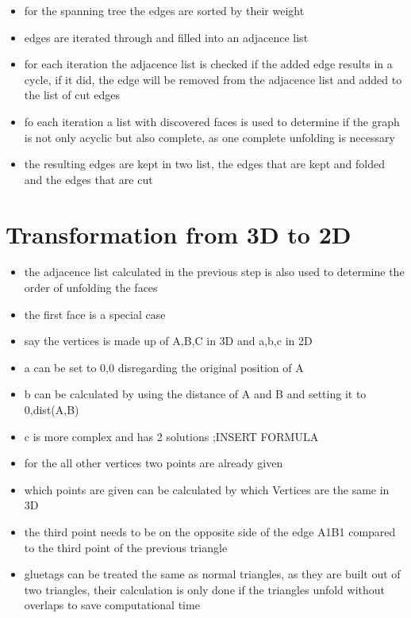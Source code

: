 \documentclass[draft,final]{vutinfth} %
\begin{document}
\begin{itemize}
	\item for the spanning tree the edges are sorted by their weight
	\item edges are iterated through and filled into an adjacence list
	\item for each iteration the adjacence list is checked if the added edge results in a cycle, if it did, the edge will be removed from the adjacence list and added to the list of cut edges
	\item fo each iteration a list with discovered faces is used to determine if the graph is not only acyclic but also complete, as one complete unfolding is necessary
	\item the resulting edges are kept in two list, the edges that are kept and folded and the edges that are cut
\end{itemize}

\section{Transformation from 3D to 2D}

\begin{itemize}
	\item the adjacence list calculated in the previous step is also used to determine the order of unfolding the faces
	\item the first face is a special case
	\item say the vertices is made up of A,B,C in 3D and a,b,c in 2D
	\item a can be set to 0,0 disregarding the original position of A
	\item b can be calculated by using the distance of A and B and setting it to 0,dist(A,B)
	\item c is more complex and has 2 solutions ;INSERT FORMULA
	\item for the all other vertices two points are already given
	\item which points are given can be calculated by which Vertices are the same in 3D
	\item the third point needs to be on the opposite side of the edge A1B1 compared to the third point of the previous triangle
	\item gluetags can be treated the same as normal triangles, as they are built out of two triangles, their calculation is only done if the triangles unfold without overlaps to save computational time
\end{itemize}
\end{document}
